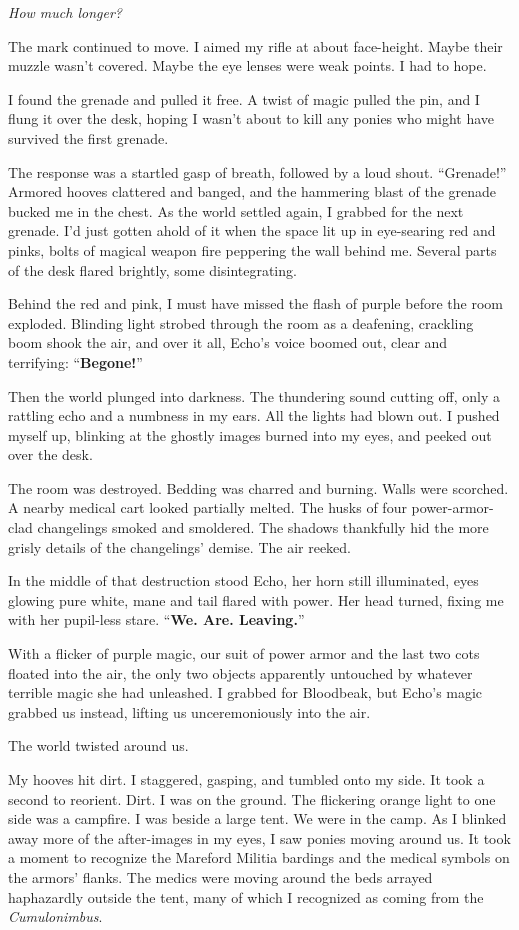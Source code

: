 \textit{How much longer?}

The mark continued to move. I aimed my rifle at about face-height. Maybe their muzzle wasn’t covered. Maybe the eye lenses were weak points. I had to hope.

I found the grenade and pulled it free. A twist of magic pulled the pin, and I flung it over the desk, hoping I wasn’t about to kill any ponies who might have survived the first grenade.

The response was a startled gasp of breath, followed by a loud shout. “Grenade!” Armored hooves clattered and banged, and the hammering blast of the grenade bucked me in the chest. As the world settled again, I grabbed for the next grenade. I’d just gotten ahold of it when the space lit up in eye-searing red and pinks, bolts of magical weapon fire peppering the wall behind me. Several parts of the desk flared brightly, some disintegrating.

Behind the red and pink, I must have missed the flash of purple before the room exploded. Blinding light strobed through the room as a deafening, crackling boom shook the air, and over it all, Echo’s voice boomed out, clear and terrifying: “\textbf{Begone!}”

Then the world plunged into darkness. The thundering sound cutting off, only a rattling echo and a numbness in my ears. All the lights had blown out. I pushed myself up, blinking at the ghostly images burned into my eyes, and peeked out over the desk.

The room was destroyed. Bedding was charred and burning. Walls were scorched. A nearby medical cart looked partially melted. The husks of four power-armor-clad changelings smoked and smoldered. The shadows thankfully hid the more grisly details of the changelings’ demise. The air reeked.

In the middle of that destruction stood Echo, her horn still illuminated, eyes glowing pure white, mane and tail flared with power. Her head turned, fixing me with her pupil-less stare. “\textbf{We. Are. Leaving.}”

With a flicker of purple magic, our suit of power armor and the last two cots floated into the air, the only two objects apparently untouched by whatever terrible magic she had unleashed. I grabbed for Bloodbeak, but Echo’s magic grabbed us instead, lifting us unceremoniously into the air.

The world twisted around us.

My hooves hit dirt. I staggered, gasping, and tumbled onto my side. It took a second to reorient. Dirt. I was on the ground. The flickering orange light to one side was a campfire. I was beside a large tent. We were in the camp. As I blinked away more of the after-images in my eyes, I saw ponies moving around us. It took a moment to recognize the Mareford Militia bardings and the medical symbols on the armors’ flanks. The medics were moving around the beds arrayed haphazardly outside the tent, many of which I recognized as coming from the \textit{Cumulonimbus}.

